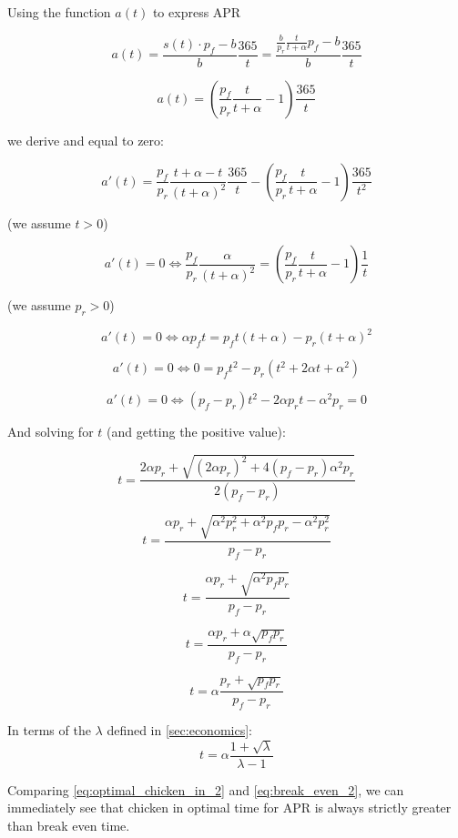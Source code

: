 \documentclass{article}
\begin{document}
Using the function $a(t)$ to express APR

\[
a(t) = \frac{s(t) \cdot p_f - b}{b} \frac{365}{t} = \frac{\frac{b}{p_r} \frac{t}{t+\alpha} p_f - b}{b} \frac{365}{t}
\]

\begin{equation}
  \label{eq:apr}
a(t) = \left(\frac{p_f}{p_r} \frac{t}{t+\alpha} - 1\right) \frac{365}{t}
\end{equation}

we derive and equal to zero:

\[
a'(t) = \frac{p_f}{p_r} \frac{t + \alpha - t}{(t+\alpha)^2} \frac{365}{t} - \left(\frac{p_f}{p_r} \frac{t}{t+\alpha} - 1\right) \frac{365}{t^2}
\]

(we assume $t > 0$)

\[
a'(t) = 0 \iff \frac{p_f}{p_r} \frac{\alpha}{(t+\alpha)^2} = \left(\frac{p_f}{p_r} \frac{t}{t+\alpha} - 1\right) \frac{1}{t}
\]

(we assume $p_r > 0$)

\[
a'(t) = 0 \iff \alpha p_f t = p_f t(t+\alpha)  - p_r(t+\alpha)^2
\]

\[
a'(t) = 0 \iff 0 = p_f t^2 - p_r(t^2+2\alpha t+\alpha^2)
\]

\[
a'(t) = 0 \iff (p_f-p_r)t^2  - 2\alpha p_r t - \alpha^2 p_r = 0
\]

And solving for $t$ (and getting the positive value):

\[
t = \frac{2\alpha p_r + \sqrt{(2\alpha p_r)^2 + 4(p_f-p_r) \alpha^2 p_r}}{2(p_f-p_r)}
\]

\[
t = \frac{\alpha p_r + \sqrt{\alpha^2 p_r^2 + \alpha^2 p_f p_r- \alpha^2 p_r^2}}{p_f-p_r}
\]

\[
t = \frac{\alpha p_r + \sqrt{\alpha^2 p_f p_r}}{p_f-p_r}
\]

\[
t = \frac{\alpha p_r + \alpha \sqrt{p_f p_r}}{p_f-p_r}
\]

\begin{equation}
  \label{eq:optimal_chicken_in_1}
t = \alpha \frac{p_r + \sqrt{p_f p_r}}{p_f-p_r}
\end{equation}

In terms of the $\lambda$ defined in \ref{sec:economics}:
\begin{equation}
  \label{eq:optimal_chicken_in_2}
t = \alpha \frac{1 + \sqrt{\lambda}}{\lambda - 1}
\end{equation}

Comparing \ref{eq:optimal_chicken_in_2} and \ref{eq:break_even_2}, we can immediately see that chicken in optimal time for APR is always strictly greater than break even time.
\end{document}
